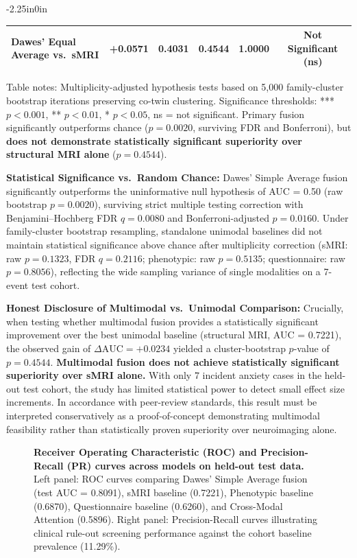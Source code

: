 \documentclass[10pt,letterpaper]{article}
\begin{document}
\begin{table}[!t]
\begin{adjustwidth}{-2.25in}{0in}
\begin{tabular}{|l|c|c|c|c|c|}
\hline
Dawes' Equal Average vs.\ sMRI & +0.0571 & 0.4031 & 0.4544 & 1.0000 & Not Significant (ns) \\
\hline
\end{tabular}
\begin{flushleft}
Table notes: Multiplicity-adjusted hypothesis tests based on 5,000 family-cluster bootstrap iterations preserving co-twin clustering. Significance thresholds: *** $p < 0.001$, ** $p < 0.01$, * $p < 0.05$, ns = not significant. Primary fusion significantly outperforms chance ($p = 0.0020$, surviving FDR and Bonferroni), but \textbf{does not demonstrate statistically significant superiority over structural MRI alone} ($p = 0.4544$).
\end{flushleft}
\end{adjustwidth}
\end{table}

\textbf{Statistical Significance vs.\ Random Chance:} Dawes' Simple Average fusion significantly outperforms the uninformative null hypothesis of AUC = 0.50 (raw bootstrap $p = 0.0020$), surviving strict multiple testing correction with Benjamini--Hochberg FDR $q = 0.0080$ and Bonferroni-adjusted $p = 0.0160$. Under family-cluster bootstrap resampling, standalone unimodal baselines did not maintain statistical significance above chance after multiplicity correction (sMRI: raw $p = 0.1323$, FDR $q = 0.2116$; phenotypic: raw $p = 0.5135$; questionnaire: raw $p = 0.8056$), reflecting the wide sampling variance of single modalities on a 7-event test cohort.

\textbf{Honest Disclosure of Multimodal vs.\ Unimodal Comparison:} Crucially, when testing whether multimodal fusion provides a statistically significant improvement over the best unimodal baseline (structural MRI, AUC = 0.7221), the observed gain of $\Delta\text{AUC} = +0.0234$ yielded a cluster-bootstrap $p$-value of $p = 0.4544$. \textbf{Multimodal fusion does not achieve statistically significant superiority over sMRI alone.} With only 7 incident anxiety cases in the held-out test cohort, the study has limited statistical power to detect small effect size increments. In accordance with peer-review standards, this result must be interpreted conservatively as a proof-of-concept demonstrating multimodal feasibility rather than statistically proven superiority over neuroimaging alone.
        \begin{figure}[!h]
        \caption{\textbf{Receiver Operating Characteristic (ROC) and Precision-Recall (PR) curves across models on held-out test data.}
        Left panel: ROC curves comparing Dawes' Simple Average fusion (test AUC = 0.8091), sMRI baseline (0.7221), Phenotypic baseline (0.6870), Questionnaire baseline (0.6260), and Cross-Modal Attention (0.5896). Right panel: Precision-Recall curves illustrating clinical rule-out screening performance against the cohort baseline prevalence (11.29\%).}
        \label{fig:roc_pr_curves}
        \end{figure}
\end{document}
